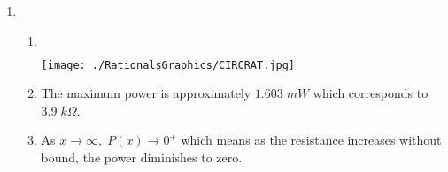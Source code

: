 \begin{enumerate}
\begin{enumerate}
\end{enumerate}

\item \begin{enumerate}

\item $~$

\centerline{\texttt{[image: ./RationalsGraphics/CIRCRAT.jpg]}}

\item The maximum power is approximately $1.603 \; mW$ which corresponds to $3.9 \; k\Omega$.

\item As $x \rightarrow \infty, \; P(x) \rightarrow 0^{+}$ which means as the resistance increases without bound, the power diminishes to zero.

\end{enumerate}

\end{enumerate}

\closegraphsfile